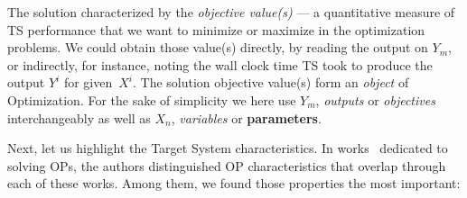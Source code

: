 The solution characterized by the \emph{objective value(s)} — a quantitative measure of TS performance that we want to minimize or maximize in the optimization problems. We could obtain those value(s) directly, by reading the output on $Y_m$, or indirectly, for instance, noting the wall clock time TS took to produce the output $Y^i$ for given~$X^i$. The solution objective value(s) form an \emph{object} of Optimization. 
For the sake of simplicity we here use $Y_m$, \textit{outputs} or \textit{objectives} interchangeably as well as $X_n$, \textit{variables} or \textbf{parameters}.

Next, let us highlight the Target System characteristics. In works~\cite{biegler2004retrospective,figueira2014hybrid,deb2014multi,amaran2016simulation} dedicated to solving OPs, the authors distinguished OP characteristics that overlap through each of these works. Among them, we found those properties the most important:
